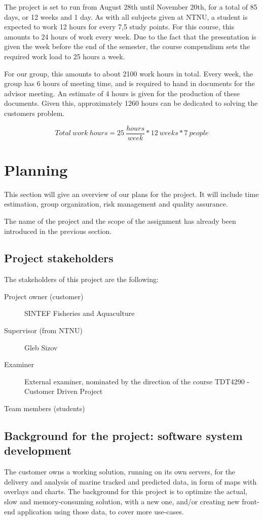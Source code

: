 \documentclass[11pt,a4paper,titlepage,oneside]{report}
\begin{document}
The project is set to run from August 28th until November 20th, for a total of 85 days, or 12 weeks and 1 day. As with all subjects given at NTNU, a student is expected to work 12 hours for every 7,5 study points. For this course, this amounts to 24 hours of work every week. Due to the fact that the presentation is given the week before the end of the semester, the course compendium sets the required work load to 25 hours a week. 

For our group, this amounts to about 2100 work hours in total. Every week, the group has 6 hours of meeting time, and is required to hand in documents for the advisor meeting. An estimate of 4 hours is given for the production of these documents. Given this, approximately 1260 hours can be dedicated to solving the customers problem.

\begin{equation}
Total\:work\:hours = 25\:\frac{hours}{week} * 12\:weeks * 7\:people \nonumber
\end{equation}

\chapter{Planning}
This section will give an overview of our plans for the project. It will include time estimation, group organization, risk management and quality assurance.

The name of the project and the scope of the assignment has already been introduced in the previous section.
\section{Project stakeholders}
The stakeholders of this project are the following:
\begin{description}
\item[Project owner (customer)] SINTEF Fisheries and Aquaculture
\item[Supervisor (from NTNU)] Gleb Sizov
\item[Examiner] External examiner, nominated by the direction of the course TDT4290 - Customer Driven Project
\item[Team members (students)] 
\end{description}

\section{Background for the project: software system development}
The customer owns a working solution, running on its own servers, for the delivery and analysis of marine tracked and predicted data, in form of maps with overlays and charts.
The background for this project is to optimize the actual, slow and memory-consuming solution, with a new one, and/or creating new front-end application using those data, to cover more use-cases.
\end{document}
